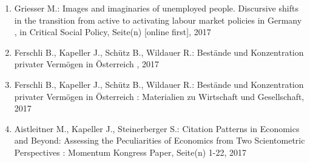 \begin{enumerate}[leftmargin=*, labelsep=0.5cm]
	 \item Griesser M.:  Images and imaginaries of unemployed people. Discursive shifts in the transition from active to activating labour market policies in Germany  , in Critical Social Policy, Seite(n) [online first], 2017
	 \item Ferschli B., Kapeller J., Schütz B., Wildauer R.:  Bestände und Konzentration privater Vermögen in Österreich  , 2017
	 \item Ferschli B., Kapeller J., Schütz B., Wildauer R.:  Bestände und Konzentration privater Vermögen in Österreich  : Materialien zu Wirtschaft und Gesellschaft, 2017
	 \item Aistleitner M., Kapeller J., Steinerberger S.:  Citation Patterns in Economics and Beyond: Assessing the Peculiarities of Economics from Two Scientometric Perspectives  : Momentum Kongress Paper, Seite(n) 1-22, 2017
\end{enumerate} 
